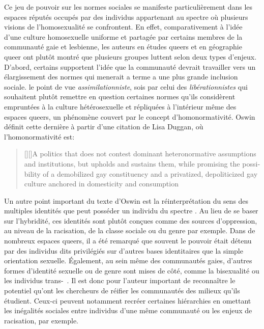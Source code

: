 Ce jeu de pouvoir sur les normes sociales se manifeste particulièrement dans les espaces réputés occupés par des individus appartenant au spectre \lgbt{} où plusieurs visions de l'homosexualité se confrontent. 
En effet, comparativement à l'idée d'une culture homosexuelle uniforme et partagée par certains membres de la communauté gaie et lesbienne, les auteurs en études queers et en géographie queer ont plutôt montré que plusieurs groupes luttent selon deux types d'enjeux.
D'abord, certains supportent l'idée que la communauté devrait travailler vers un élargissement des normes qui menerait a terme a une plus grande inclusion sociale. le point de vue \emph{assimilationniste}, sois par celui des \emph{libérationnistes} qui souhaitent plutôt remettre en question certaines normes qu'ils considèrent empruntées à la culture hétérosexuelle et répliquées à l'intérieur même des espaces queers, un phénomène couvert par le concept d'homonormativité. 
Oswin définit cette dernière à partir d'une citation de Lisa Duggan, où l'homonormativité est: 
\foreignblockquote{english}[{\cite[tel que cité dans][92]{Oswin2008}}][]{[{\cite[50]{Duggan2003}}][]{A politics that does not contest dominant heteronormative assumptions and institutions, but upholds and sustains them, while promising the possibility of a demobilized gay constituency and a privatized, depoliticized gay culture anchored in domesticity and consumption}}.

Un autre point important du texte d'Oswin est la réinterprétation du sens des multiples identités que peut posséder un individu du spectre \lgbt{}. 
Au lieu de se baser sur l'hybridité, ces identités sont plutôt conçues comme des sources d'oppression, au niveau de la racisation, de la classe sociale ou du genre par exemple. 
Dans de nombreux espaces queers, il a été remarqué que souvent le pouvoir était détenu par des individus dits privilégiés sur d'autres bases identitaires que la simple orientation sexuelle. 
Également, au sein même des communautés gaies, d'autres formes d'identité sexuelle ou de genre sont mises de côté, comme la bisexualité ou les individus trans-~\citep[93]{Oswin2008}.
Il est donc pour l'auteur important de reconnaître le potentiel qu'ont les chercheurs de réifier les communautés des milieux qu'ils étudient. Ceux-ci peuvent notamment recréer certaines hiérarchies en omettant les inégalités sociales entre individus d'une même communauté ou les enjeux de racisation, par exemple.

